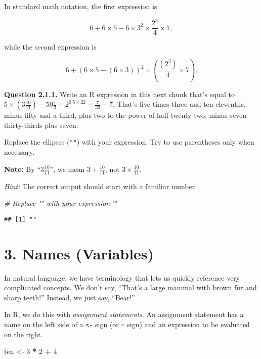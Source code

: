 \documentclass[
]{article}
\newenvironment{Shaded}{\begin{snugshade}}{\end{snugshade}}
\newcommand{\CommentTok}[1]{\textcolor[rgb]{0.56,0.35,0.01}{\textit{#1}}}
\newcommand{\DecValTok}[1]{\textcolor[rgb]{0.00,0.00,0.81}{#1}}
\newcommand{\NormalTok}[1]{#1}
\newcommand{\OtherTok}[1]{\textcolor[rgb]{0.56,0.35,0.01}{#1}}
\newcommand{\SpecialCharTok}[1]{\textcolor[rgb]{0.81,0.36,0.00}{\textbf{#1}}}
\newcommand{\StringTok}[1]{\textcolor[rgb]{0.31,0.60,0.02}{#1}}
\begin{document}
In standard math notation, the first expression is

\[6 + 6 \times 5 - 6 \times 3^2 \times \frac{2^3}{4} \times 7,\]

while the second expression is

\[6 + (6 \times 5 - (6 \times 3))^2 \times \left(\frac{\left(2^3\right)}{4} \times 7\right).\]

\textbf{Question 2.1.1.} Write an R expression in this next chunk that's
equal to
\(\displaystyle 5 \times \left(3 \frac{10}{11}\right) - 50 \frac{1}{3} + 2^{0.5 \times 22} - \frac{7}{33} + 7\).
That's five times three and ten elevenths, minus fifty and a third, plus
two to the power of half twenty-two, minus seven thirty-thirds plus
seven.

Replace the ellipses (\texttt{""}) with your expression. Try to use
parentheses only when necessary.

\textbf{Note:} By ``\(\displaystyle 3 \frac{10}{11}\)'', we mean
\(\displaystyle 3+\frac{10}{11}\), not
\(\displaystyle 3 \times \frac{10}{11}\).

\emph{Hint:} The correct output should start with a familiar number.

\begin{Shaded}
\begin{Highlighting}[]
\CommentTok{\# Replace "" with your expression}
\StringTok{""}
\end{Highlighting}
\end{Shaded}

\begin{verbatim}
## [1] ""
\end{verbatim}

\section{3. Names (Variables)}\label{names-variables}

In natural language, we have terminology that lets us quickly reference
very complicated concepts. We don't say, ``That's a large mammal with
brown fur and sharp teeth!'' Instead, we just say, ``Bear!''

In R, we do this with \emph{assignment statements}. An assignment
statement has a name on the left side of a \texttt{\textless{}-} sign
(or \texttt{=} sign) and an expression to be evaluated on the right.

\begin{Shaded}
\begin{Highlighting}[]
\NormalTok{ten }\OtherTok{\textless{}{-}} \DecValTok{3} \SpecialCharTok{*} \DecValTok{2} \SpecialCharTok{+} \DecValTok{4}
\end{Highlighting}
\end{Shaded}
\end{document}

